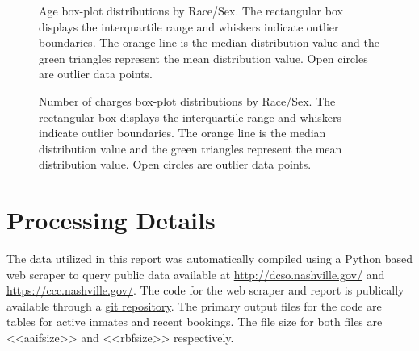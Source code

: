 \documentclass{article}
\begin{document}
\begin{figure}[H]
\centering
\noindent{}
\caption{Age box-plot distributions by Race/Sex. The rectangular box displays the interquartile range and whiskers indicate outlier boundaries. The orange line is the median distribution value and the green triangles represent the mean distribution value. Open circles are outlier data points.}
\label{fig:Age_BoxP}
\end{figure}

\begin{figure}[H]
\centering
\noindent{}
\caption{Number of charges box-plot distributions by Race/Sex. The rectangular box displays the interquartile range and whiskers indicate outlier boundaries. The orange line is the median distribution value and the green triangles represent the mean distribution value. Open circles are outlier data points.}
\label{fig:Ncharges_BoxP}
\end{figure}


\section{Processing Details}
The data utilized in this report was automatically compiled using a Python based web scraper to query public data available at \url{http://dcso.nashville.gov/} and \url{https://ccc.nashville.gov/}. The code for the web scraper and report is publically available through a \href{https://github.com/dmdixon/bail}{git repository}. The primary output files for the code are tables for active inmates and recent bookings. The file size for both files are <<aaifsize>> and <<rbfsize>> respectively.
\end{document}
